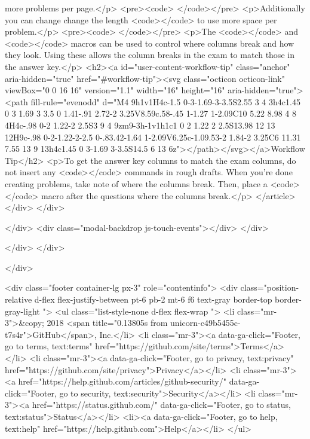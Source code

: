 more problems per page.</p>
<pre><code>    
</code></pre>
<p>Additionally you can change change  the length  <code>\columnsep</code> to use more space
per problem.</p>
<pre><code>    \setlength\columnsep{10pt}
</code></pre>
<p>The <code>\raggedcolumns</code> and <code>\columnbreak</code> macros can be used to control where
columns break and how they look. Using these allows the column breaks in the
exam to match those in the answer key.</p>
<h2><a id="user-content-workflow-tip" class="anchor" aria-hidden="true" href="#workflow-tip"><svg class="octicon octicon-link" viewBox="0 0 16 16" version="1.1" width="16" height="16" aria-hidden="true"><path fill-rule="evenodd" d="M4 9h1v1H4c-1.5 0-3-1.69-3-3.5S2.55 3 4 3h4c1.45 0 3 1.69 3 3.5 0 1.41-.91 2.72-2 3.25V8.59c.58-.45 1-1.27 1-2.09C10 5.22 8.98 4 8 4H4c-.98 0-2 1.22-2 2.5S3 9 4 9zm9-3h-1v1h1c1 0 2 1.22 2 2.5S13.98 12 13 12H9c-.98 0-2-1.22-2-2.5 0-.83.42-1.64 1-2.09V6.25c-1.09.53-2 1.84-2 3.25C6 11.31 7.55 13 9 13h4c1.45 0 3-1.69 3-3.5S14.5 6 13 6z"></path></svg></a>Workflow Tip</h2>
<p>To get the answer key columns to match the exam columns, do not insert any
<code>\columnbreak</code> commands in rough drafts.  When you're done creating problems,
take note of where the columns break.  Then, place a <code>\columnbreak</code> macro after
the questions where the columns break.</p>
</article>
      </div>
  </div>


  </div>
  <div class="modal-backdrop js-touch-events"></div>
</div>

    </div>
  </div>

  </div>

        
<div class="footer container-lg px-3" role="contentinfo">
  <div class="position-relative d-flex flex-justify-between pt-6 pb-2 mt-6 f6 text-gray border-top border-gray-light ">
    <ul class="list-style-none d-flex flex-wrap ">
      <li class="mr-3">&copy; 2018 <span title="0.13805s from unicorn-c49b5455c-t7s4r">GitHub</span>, Inc.</li>
        <li class="mr-3"><a data-ga-click="Footer, go to terms, text:terms" href="https://github.com/site/terms">Terms</a></li>
        <li class="mr-3"><a data-ga-click="Footer, go to privacy, text:privacy" href="https://github.com/site/privacy">Privacy</a></li>
        <li class="mr-3"><a href="https://help.github.com/articles/github-security/" data-ga-click="Footer, go to security, text:security">Security</a></li>
        <li class="mr-3"><a href="https://status.github.com/" data-ga-click="Footer, go to status, text:status">Status</a></li>
        <li><a data-ga-click="Footer, go to help, text:help" href="https://help.github.com">Help</a></li>
    </ul>

